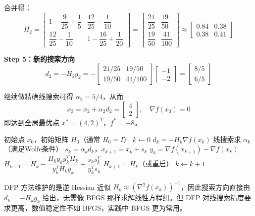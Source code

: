 \begin{example}[DFP方法]
合并得：
\[
H_2 = \begin{bmatrix}
1-\dfrac{9}{25}+\dfrac{1}{5} & \dfrac{12}{25}-\dfrac{1}{10} \\[8pt]
\dfrac{12}{25}-\dfrac{1}{10} & 1-\dfrac{16}{25}+\dfrac{1}{20}
\end{bmatrix}
= \begin{bmatrix} \dfrac{21}{25} & \dfrac{19}{50} \\[6pt] \dfrac{19}{50} & \dfrac{41}{100} \end{bmatrix}
\approx \begin{bmatrix} 0.84 & 0.38 \\ 0.38 & 0.41 \end{bmatrix}
\]

\textbf{Step 5：新的搜索方向}
\[
d_2 = -H_2 g_2 = -\begin{bmatrix} 21/25 & 19/50 \\ 19/50 & 41/100 \end{bmatrix}
\begin{bmatrix} -1 \\ -2 \end{bmatrix}
= \begin{bmatrix} 8/5 \\ 6/5 \end{bmatrix}
\]

继续做精确线搜索可得 $\alpha_2 = 5/4$，从而
\[
x_3 = x_2 + \alpha_2 d_2 = \begin{bmatrix} 4 \\ 2 \end{bmatrix},\quad
\nabla f(x_3)=0
\]
即达到全局最优点 $x^*=(4,2)^T$，$f^*=-8$。
\end{example}

\begin{algorithm}[H]
\caption{DFP方法}
\begin{algorithmic}[1]
\Require 初始点 $x_0$，初始矩阵 $H_0$（通常 $H_0 = I$）
\State $k \gets 0$
    \State $d_k = -H_k \nabla f(x_k)$
    \State 线搜索求 $\alpha_k$（满足Wolfe条件）
    \State $s_k = \alpha_k d_k$，$x_{k+1} = x_k + s_k$
    \State $y_k = \nabla f(x_{k+1}) - \nabla f(x_k)$
        \State $H_{k+1} = H_k - \dfrac{H_k y_k y_k^T H_k}{y_k^T H_k y_k} + \dfrac{s_k s_k^T}{y_k^T s_k}$
    \Else
        \State $H_{k+1} = H_k$（或重启）
    \EndIf
    \State $k \gets k + 1$
\EndWhile
\end{algorithmic}
\end{algorithm}

\begin{remark}
DFP 方法维护的是逆 Hessian 近似 $H_k \approx (\nabla^2 f(x_k))^{-1}$，因此搜索方向直接由 $d_k = -H_k g_k$ 给出，无需像 BFGS 那样求解线性方程组。但 DFP 对线搜索精度要求更高，数值稳定性不如 BFGS，实践中 BFGS 更为常用。
\end{remark}


